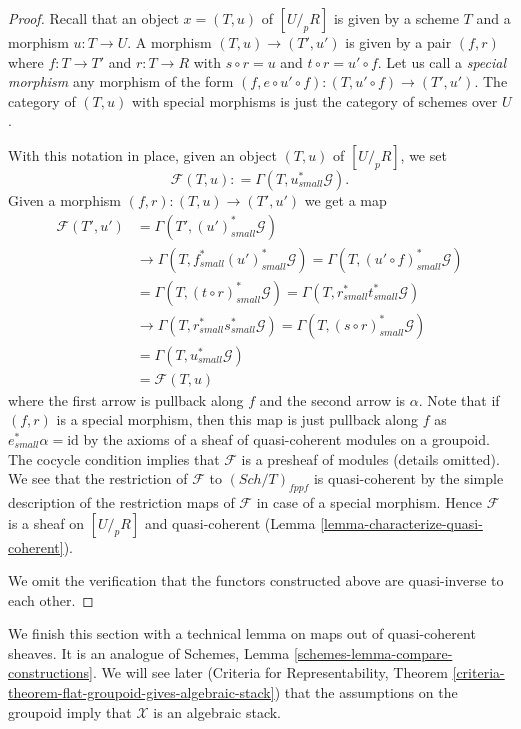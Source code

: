 \documentclass{stacks-project}
\theoremstyle{plain}
\theoremstyle{definition}
\theoremstyle{remark}
\numberwithin{equation}{subsection}
\def\Sch{\mathit{Sch}}
\begin{document}
\begin{proof}
\medskip\noindent
Recall that an object $x = (T, u)$ of $[U/_{\!p}R]$
is given by a scheme $T$ and a morphism $u : T \to U$. A morphism
$(T, u) \to (T', u')$ is given by a pair $(f, r)$ where $f : T \to T'$
and $r : T \to R$ with $s \circ r = u$ and $t \circ r = u' \circ f$.
Let us call a {\it special morphism} any morphism of the form
$(f, e \circ u' \circ f) : (T, u' \circ f) \to (T', u')$.
The category of $(T, u)$ with special morphisms is just the
category of schemes over $U$.

\medskip\noindent
With this notation in place, given an object $(T, u)$ of $[U/_{\!p}R]$, we set
$$
\mathcal{F}(T, u) : = \Gamma(T, u_{small}^*\mathcal{G}).
$$
Given a morphism $(f, r) : (T, u) \to (T', u')$ we get a map
\begin{align*}
\mathcal{F}(T', u') & = \Gamma(T', (u')_{small}^*\mathcal{G}) \\
& \to \Gamma(T, f_{small}^*(u')_{small}^*\mathcal{G}) =
\Gamma(T, (u' \circ f)_{small}^*\mathcal{G}) \\
& = \Gamma(T, (t \circ r)_{small}^*\mathcal{G}) =
\Gamma(T, r_{small}^*t_{small}^*\mathcal{G}) \\
& \to \Gamma(T, r_{small}^*s_{small}^*\mathcal{G}) =
\Gamma(T, (s \circ r)_{small}^*\mathcal{G}) \\
& = \Gamma(T, u_{small}^*\mathcal{G}) \\
& = \mathcal{F}(T, u)
\end{align*}
where the first arrow is pullback along $f$ and the second arrow is
$\alpha$. Note that if $(f, r)$ is a special morphism, then this
map is just pullback along $f$ as $e_{small}^*\alpha = \text{id}$ by
the axioms of a sheaf of quasi-coherent modules on a groupoid.
The cocycle condition implies that $\mathcal{F}$ is a presheaf
of modules (details omitted). We see that the restriction of $\mathcal{F}$
to $(\Sch/T)_{fppf}$ is quasi-coherent by the simple description of the
restriction maps of $\mathcal{F}$ in case of a special morphism.
Hence $\mathcal{F}$ is a sheaf on $[U/_{\!p}R]$ and quasi-coherent
(Lemma \ref{lemma-characterize-quasi-coherent}).

\medskip\noindent
We omit the verification that the functors constructed above are
quasi-inverse to each other.
\end{proof}

\noindent
We finish this section with a technical lemma on maps out of quasi-coherent
sheaves. It is an analogue of
Schemes, Lemma \ref{schemes-lemma-compare-constructions}.
We will see later (Criteria for Representability, Theorem
\ref{criteria-theorem-flat-groupoid-gives-algebraic-stack})
that the assumptions on the groupoid imply that $\mathcal{X}$ is
an algebraic stack.
\end{document}
